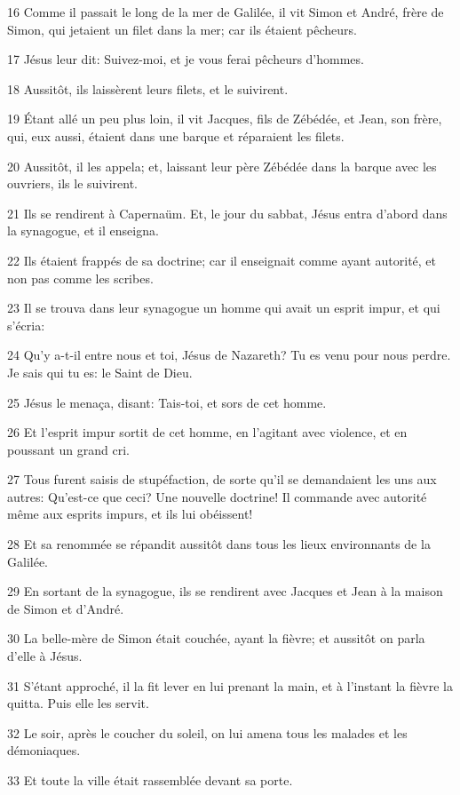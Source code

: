\par 16 Comme il passait le long de la mer de Galilée, il vit Simon et André, frère de Simon, qui jetaient un filet dans la mer; car ils étaient pêcheurs.
\par 17 Jésus leur dit: Suivez-moi, et je vous ferai pêcheurs d'hommes.
\par 18 Aussitôt, ils laissèrent leurs filets, et le suivirent.
\par 19 Étant allé un peu plus loin, il vit Jacques, fils de Zébédée, et Jean, son frère, qui, eux aussi, étaient dans une barque et réparaient les filets.
\par 20 Aussitôt, il les appela; et, laissant leur père Zébédée dans la barque avec les ouvriers, ils le suivirent.
\par 21 Ils se rendirent à Capernaüm. Et, le jour du sabbat, Jésus entra d'abord dans la synagogue, et il enseigna.
\par 22 Ils étaient frappés de sa doctrine; car il enseignait comme ayant autorité, et non pas comme les scribes.
\par 23 Il se trouva dans leur synagogue un homme qui avait un esprit impur, et qui s'écria:
\par 24 Qu'y a-t-il entre nous et toi, Jésus de Nazareth? Tu es venu pour nous perdre. Je sais qui tu es: le Saint de Dieu.
\par 25 Jésus le menaça, disant: Tais-toi, et sors de cet homme.
\par 26 Et l'esprit impur sortit de cet homme, en l'agitant avec violence, et en poussant un grand cri.
\par 27 Tous furent saisis de stupéfaction, de sorte qu'il se demandaient les uns aux autres: Qu'est-ce que ceci? Une nouvelle doctrine! Il commande avec autorité même aux esprits impurs, et ils lui obéissent!
\par 28 Et sa renommée se répandit aussitôt dans tous les lieux environnants de la Galilée.
\par 29 En sortant de la synagogue, ils se rendirent avec Jacques et Jean à la maison de Simon et d'André.
\par 30 La belle-mère de Simon était couchée, ayant la fièvre; et aussitôt on parla d'elle à Jésus.
\par 31 S'étant approché, il la fit lever en lui prenant la main, et à l'instant la fièvre la quitta. Puis elle les servit.
\par 32 Le soir, après le coucher du soleil, on lui amena tous les malades et les démoniaques.
\par 33 Et toute la ville était rassemblée devant sa porte.
